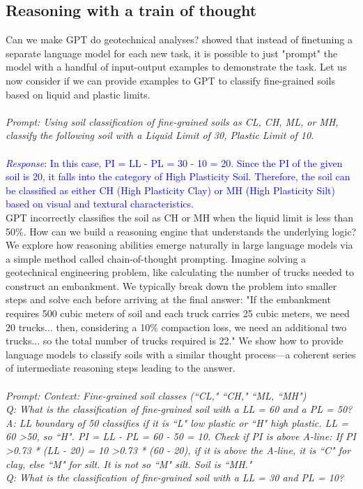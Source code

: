 \documentclass{article}
\begin{document}
\subsection{Reasoning with a train of thought}
Can we make GPT do geotechnical analyses? \cite{wei2022chain} showed that instead of finetuning a separate language model for each new task, it is possible to just "prompt" the model with a handful of input-output examples to demonstrate the task. Let us now consider if we can provide examples to GPT to classify fine-grained soils based on liquid and plastic limits.
\\\\
\textit{\textcolor{RedOrange}{Prompt: Using soil classification of fine-grained soils as CL, CH, ML, or MH, classify the following soil with a Liquid Limit of 30, Plastic Limit of 10. }}
\\\\
\textcolor{blue}{\textit{Response}: In this case, PI = LL - PL = 30 - 10 = 20. Since the PI of the given soil is 20, it falls into the category of High Plasticity Soil. Therefore, the soil can be classified as either CH (High Plasticity Clay) or MH (High Plasticity Silt) based on visual and textural characteristics.}
\\GPT incorrectly classifies the soil as CH or MH when the liquid limit is less than 50\%. How can we build a reasoning engine that understands the underlying logic? We explore how reasoning abilities emerge naturally in large language models via a simple method called chain-of-thought prompting. Imagine solving a geotechnical engineering problem, like calculating the number of trucks needed to construct an embankment. We typically break down the problem into smaller steps and solve each before arriving at the final answer: "If the embankment requires 500 cubic meters of soil and each truck carries 25 cubic meters, we need 20 trucks... then, considering a 10\% compaction loss, we need an additional two trucks... so the total number of trucks required is 22." We show how to provide language models to classify soils with a similar thought process—a coherent series of intermediate reasoning steps leading to the answer. 
\\\\
\textit{\textcolor{RedOrange}{Prompt: Context: Fine-grained soil classes (``CL," ``CH," ``ML, ``MH")
\\Q: What is the classification of fine-grained soil with a LL = 60 and a PL = 50? 
\\A: LL boundary of 50 classifies if it is ``L" low plastic or ``H" high plastic. LL = 60 \textgreater 50, so ``H". PI = LL - PL = 60 - 50 = 10. Check if PI is above A-line: If PI \textgreater 0.73 * (LL - 20) = 10 \textgreater 0.73 * (60 - 20), if it is above the A-line, it is ``C" for clay, else ``M" for silt. It is not so ``M" silt. Soil is ``MH." 
\\Q: What is the classification of fine-grained soil with a LL = 30 and PL = 10?
}}
\end{document}
